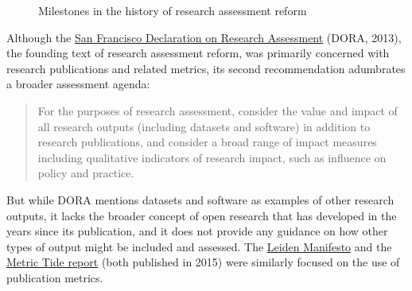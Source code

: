 \documentclass[
  letterpaper,
  DIV=11,
  numbers=noendperiod,
  oneside]{scrreprt}
\begin{document}
\begin{figure}


\caption{\label{fig-milestones}Milestones in the history of research
assessment reform}

\end{figure}%

Although the \href{https://sfdora.org/read/}{San Francisco Declaration
on Research Assessment} (DORA, 2013), the founding text of research
assessment reform, was primarily concerned with research publications
and related metrics, its second recommendation adumbrates a broader
assessment agenda:

\begin{quote}
For the purposes of research assessment, consider the value and impact
of all research outputs (including datasets and software) in addition to
research publications, and consider a broad range of impact measures
including qualitative indicators of research impact, such as influence
on policy and practice.
\end{quote}

But while DORA mentions datasets and software as examples of other
research outputs, it lacks the broader concept of open research that has
developed in the years since its publication, and it does not provide
any guidance on how other types of output might be included and
assessed. The \href{https://doi.org/10.1038/520429a}{Leiden Manifesto}
and the
\href{https://www.ukri.org/publications/review-of-metrics-in-research-assessment-and-management/}{Metric
Tide report} (both published in 2015) were similarly focused on the use
of publication metrics.
\end{document}
